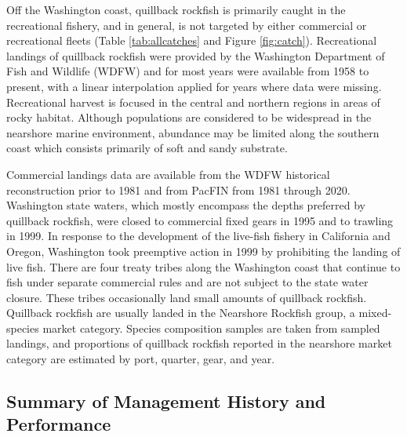 \documentclass[11pt,
  english,
  letterpaper,
]{article}
\begin{document}
\leavevmode\tagmcend\tagstructend


Off the Washington coast, quillback rockfish is primarily caught in the recreational fishery, and in general, is not targeted by either commercial or recreational fleets (Table \ref{tab:allcatches} and Figure \ref{fig:catch}). Recreational landings of quillback rockfish were provided by the Washington Department of Fish and Wildlife (WDFW) and for most years were available from 1958 to present, with a linear interpolation applied for years where data were missing. Recreational harvest is focused in the central and northern regions in areas of rocky habitat. Although populations are considered to be widespread in the nearshore marine environment, abundance may be limited along the southern coast which consists primarily of soft and sandy substrate.

\leavevmode\tagmcend\tagstructend\par


Commercial landings data are available from the WDFW historical reconstruction prior to 1981 and from PacFIN from 1981 through 2020. Washington state waters, which mostly encompass the depths preferred by quillback rockfish, were closed to commercial fixed gears in 1995 and to trawling in 1999. In response to the development of the live-fish fishery in California and Oregon, Washington took preemptive action in 1999 by prohibiting the landing of live fish. There are four treaty tribes along the Washington coast that continue to fish under separate commercial rules and are not subject to the state water closure. These tribes occasionally land small amounts of quillback rockfish. Quillback rockfish are usually landed in the Nearshore Rockfish group, a mixed-species market category. Species composition samples are taken from sampled landings, and proportions of quillback rockfish reported in the nearshore market category are estimated by port, quarter, gear, and year.

\leavevmode\tagmcend\tagstructend\par


\hypertarget{summary-of-management-history-and-performance}{%
\subsection{Summary of Management History and Performance}\label{summary-of-management-history-and-performance}}
\end{document}
